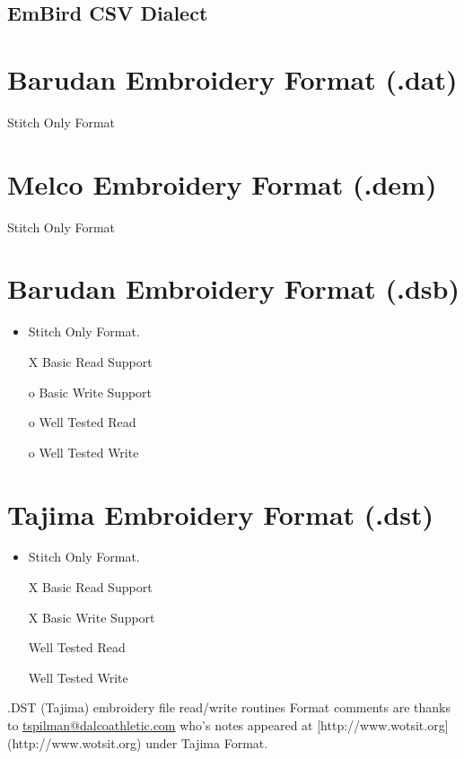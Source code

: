 \subsection{EmBird CSV Dialect}

\section{Barudan Embroidery Format (.dat)}

Stitch Only Format

\section{Melco Embroidery Format (.dem)}

Stitch Only Format

\section{Barudan Embroidery Format (.dsb)}

\begin{itemize}
\item Stitch Only Format.
\item [X] Basic Read Support
\item [o] Basic Write Support
\item [o] Well Tested Read
\item [o] Well Tested Write
\end{itemize}

\section{Tajima Embroidery Format (.dst)}

\begin{itemize}
\item Stitch Only Format.
\item [X] Basic Read Support
\item [X] Basic Write Support
\item [ ] Well Tested Read
\item [ ] Well Tested Write
\end{itemize}

.DST (Tajima) embroidery file read/write routines
Format comments are thanks to \url{tspilman@dalcoathletic.com} who's
notes appeared at [http://www.wotsit.org](http://www.wotsit.org) under Tajima Format.

